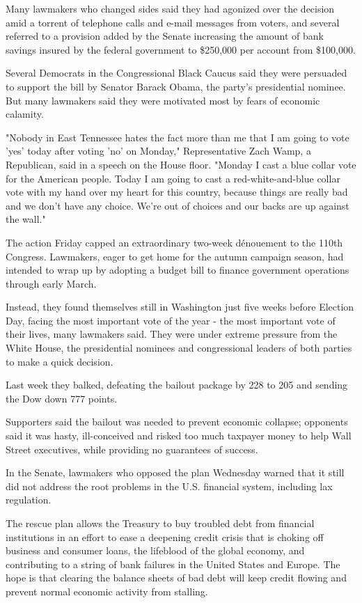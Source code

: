 Many lawmakers who changed sides said they had agonized over the
decision amid a torrent of telephone calls and e-mail messages from
voters, and several referred to a provision added by the Senate
increasing the amount of bank savings insured by the federal government
to \$250,000 per account from \$100,000.

Several Democrats in the Congressional Black Caucus said they were
persuaded to support the bill by Senator Barack Obama, the party's
presidential nominee. But many lawmakers said they were motivated most
by fears of economic calamity.

"Nobody in East Tennessee hates the fact more than me that I am going to
vote 'yes' today after voting 'no' on Monday," Representative Zach Wamp,
a Republican, said in a speech on the House floor. "Monday I cast a blue
collar vote for the American people. Today I am going to cast a
red-white-and-blue collar vote with my hand over my heart for this
country, because things are really bad and we don't have any choice.
We're out of choices and our backs are up against the wall."

The action Friday capped an extraordinary two-week dénouement to the
110th Congress. Lawmakers, eager to get home for the autumn campaign
season, had intended to wrap up by adopting a budget bill to finance
government operations through early March.

Instead, they found themselves still in Washington just five weeks
before Election Day, facing the most important vote of the year - the
most important vote of their lives, many lawmakers said. They were under
extreme pressure from the White House, the presidential nominees and
congressional leaders of both parties to make a quick decision.

Last week they balked, defeating the bailout package by 228 to 205 and
sending the Dow down 777 points.

Supporters said the bailout was needed to prevent economic collapse;
opponents said it was hasty, ill-conceived and risked too much taxpayer
money to help Wall Street executives, while providing no guarantees of
success.

In the Senate, lawmakers who opposed the plan Wednesday warned that it
still did not address the root problems in the U.S. financial system,
including lax regulation.

The rescue plan allows the Treasury to buy troubled debt from financial
institutions in an effort to ease a deepening credit crisis that is
choking off business and consumer loans, the lifeblood of the global
economy, and contributing to a string of bank failures in the United
States and Europe. The hope is that clearing the balance sheets of bad
debt will keep credit flowing and prevent normal economic activity from
stalling.

